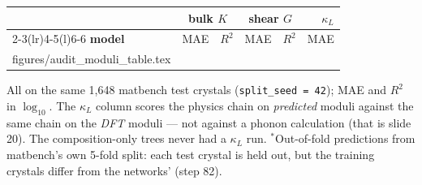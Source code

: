 \documentclass[aspectratio=169]{beamer}
\makeatletter
\newcommand{\TableRows}[1]{\@@input #1 }
\makeatother
\begin{document}
\begin{frame}

\begin{center}
{\sffamily\scriptsize
\begin{tabular}{@{}lrrrrr@{}}
\toprule
& \multicolumn{2}{c}{\textbf{bulk $K$}} & \multicolumn{2}{c}{\textbf{shear $G$}} & \textbf{$\kappa_L$} \\
\cmidrule(lr){2-3}\cmidrule(lr){4-5}\cmidrule(l){6-6}
\textbf{model} & MAE & $R^2$ & MAE & $R^2$ & MAE \\
\midrule
\TableRows{figures/audit_moduli_table.tex}
\bottomrule
\end{tabular}}
\end{center}

\vspace{3pt}
{\sffamily\scriptsize
All on the same 1{,}648 matbench test crystals (\texttt{split\_seed = 42});
MAE and $R^2$ in $\log_{10}$. The $\kappa_L$ column scores the physics chain on
\emph{predicted} moduli against the same chain on the \emph{DFT} moduli --- not
against a phonon calculation (that is slide 20). The composition-only trees
never had a $\kappa_L$ run. $^{*}$Out-of-fold predictions from matbench's own
5-fold split: each test crystal is held out, but the training crystals differ
from the networks' (step 82).\par}

\end{frame}
\end{document}
